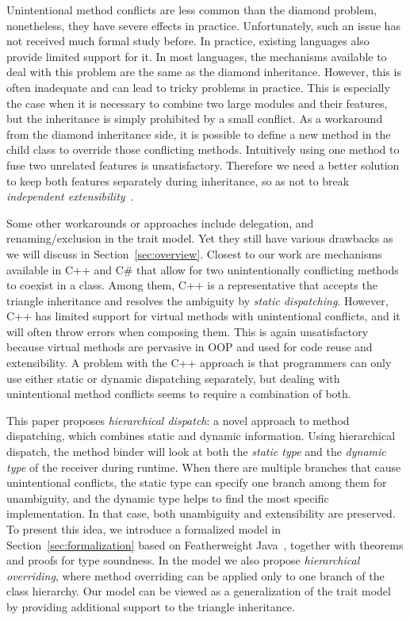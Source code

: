 Unintentional method conflicts are less common than the diamond
problem, nonetheless, they have severe effects in practice. 
Unfortunately, such an issue has not received much formal study 
before. In practice, existing languages also provide limited support for
it. In most languages, the mechanisms available to deal with this problem are the same as the diamond
inheritance. However, this is often inadequate and can lead 
to tricky problems in practice. This is especially the case
when it is necessary to combine two large modules and their features,
but the inheritance is simply prohibited by a small conflict. As
a workaround from the diamond inheritance side, it is possible to
define a new method in the child class to override those conflicting
methods. Intuitively using one method to fuse two unrelated features
is unsatisfactory. Therefore we need a better solution to keep both
features separately during inheritance, so as not to break
\emph{independent extensibility}~\cite{zenger05independentlyextensible}.

Some other workarounds or approaches include delegation, and
renaming/exclusion in the trait model. Yet they still have various
drawbacks as we will discuss in Section~\ref{sec:overview}. Closest to our work
are mechanisms available in C++ and C\# that allow for two
unintentionally conflicting methods to coexist in a class. Among them, 
C++ is a representative that accepts the triangle inheritance and
resolves the ambiguity by \emph{static dispatching}. However, C++ has
limited support for virtual methods with unintentional conflicts, and
it will often throw errors when composing them. This is again
unsatisfactory because virtual methods are pervasive in OOP and used 
for code reuse and extensibility. A problem with the C++ approach is
that programmers can only use either static or dynamic dispatching separately, but dealing
with unintentional method conflicts seems to require a combination of both. 


This paper proposes \textit{hierarchical dispatch}: a novel approach
to method dispatching, which combines static and dynamic
information. Using hierarchical dispatch, the method binder will look
at both the \emph{static type} and the \emph{dynamic type} of the
receiver during runtime. When there are multiple branches that cause
unintentional conflicts, the static type can specify one branch among
them for unambiguity, and the dynamic type helps to find the most
specific implementation. In that case, both unambiguity and
extensibility are preserved. To present this idea, we introduce a
formalized model \MIM{} in Section~\ref{sec:formalization} based on
Featherweight Java~\cite{Igarashi01FJ}, together with theorems and
proofs for type soundness. In the model we also propose
\textit{hierarchical overriding}, where method overriding can be applied
only to one branch of the class hierarchy. Our model can be viewed as
a generalization of the trait model by providing additional support to
the triangle inheritance.

